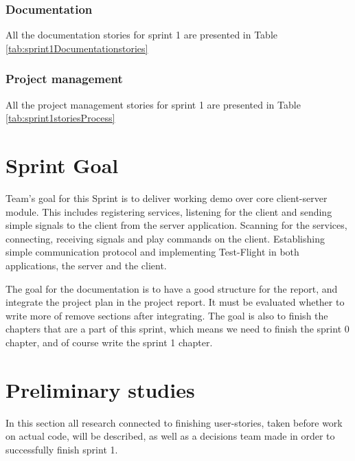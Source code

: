 \subsubsection*{Documentation}
All the documentation stories for sprint 1 are presented in Table \ref{tab:sprint1Documentationstories}

\subsubsection*{Project management}
All the project management stories for sprint 1 are presented in Table \ref{tab:sprint1storiesProcess}


\section{Sprint Goal}

Team's goal for this Sprint is to deliver working demo over core client-server module.
This includes registering services, listening for the client and sending simple signals to the client from the server application.
Scanning for the services, connecting, receiving signals and play commands on the client.
Establishing simple communication protocol and implementing Test-Flight in both applications, the server and the client.

The goal for the documentation is to have a good structure for the report, and integrate the project plan in the project report. It must be evaluated whether to write more of remove sections after integrating. The goal is also to finish the chapters that are a part of this sprint, which means we need to finish the sprint 0 chapter, and of course write the sprint 1 chapter.

\section {Preliminary studies}
In this section all research connected to finishing user-stories, taken before work on actual code, will be described, as well as a decisions team made in order to successfully finish sprint 1.

